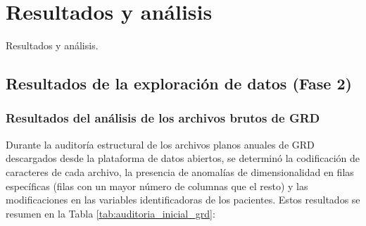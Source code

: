 \chapter{Resultados y análisis}
\label{cap:resultados}

Resultados y análisis.


\section{Resultados de la exploración de datos (Fase 2)}
\label{sec:resultados_fase2}

\subsection{Resultados del análisis de los archivos brutos de GRD}

Durante la auditoría estructural de los archivos planos anuales de GRD descargados desde la plataforma de datos abiertos, se determinó la codificación de caracteres de cada archivo, la presencia de anomalías de dimensionalidad en filas específicas (filas con un mayor número de columnas que el resto) y las modificaciones en las variables identificadoras de los pacientes. Estos resultados se resumen en la Tabla \ref{tab:auditoria_inicial_grd}:

